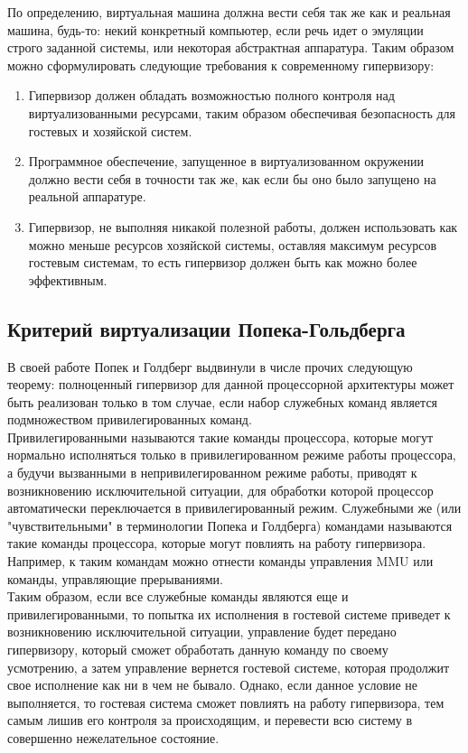 \documentclass[14pt, a4paper]{article}
\begin{document}
По определению, виртуальная машина должна вести себя так же как и реальная
машина, будь-то: некий конкретный компьютер, если речь идет о эмуляции строго
заданной системы, или некоторая абстрактная аппаратура. Таким образом можно
сформулировать следующие требования к современному гипервизору:
\begin{enumerate}
    \item Гипервизор должен обладать возможностью полного контроля над
    виртуализованными ресурсами, таким образом обеспечивая безопасность для
    гостевых и хозяйской систем.
    \item Программное обеспечение, запущенное в виртуализованном окружении должно
    вести себя в точности так же, как если бы оно было запущено на реальной
    аппаратуре.
    \item Гипервизор, не выполняя никакой полезной работы, должен использовать как
    можно меньше ресурсов хозяйской системы, оставляя максимум ресурсов
    гостевым системам, то есть гипервизор должен быть как можно более
    эффективным.
\end{enumerate}

\subsection*{Критерий виртуализации Попека-Гольдберга}

В своей работе Попек и Голдберг выдвинули в числе прочих следующую теорему:
полноценный гипервизор для данной процессорной архитектуры может быть
реализован только в том случае, если набор служебных команд является
подмножеством привилегированных команд.\\

Привилегированными называются такие команды процессора, которые могут
нормально исполняться только в привилегированном режиме работы процессора, а
будучи вызванными в непривилегированном режиме работы, приводят к
возникновению исключительной ситуации, для обработки которой процессор
автоматически переключается в привилегированный режим. Служебными же (или
"чувствительными" в терминологии Попека и Голдберга) командами называются такие
команды процессора, которые могут повлиять на работу гипервизора. Например, к
таким командам можно отнести команды управления MMU или команды, управляющие
прерываниями.\\

Таким образом, если все служебные команды являются еще и привилегированными,
то попытка их исполнения в гостевой системе приведет к возникновению
исключительной ситуации, управление будет передано гипервизору, который сможет
обработать данную команду по своему усмотрению, а затем управление вернется
гостевой системе, которая продолжит свое исполнение как ни в чем не бывало.
Однако, если данное условие не выполняется, то гостевая система сможет повлиять
на работу гипервизора, тем самым лишив его контроля за происходящим, и перевести
всю систему в совершенно нежелательное состояние.\\
\end{document}
